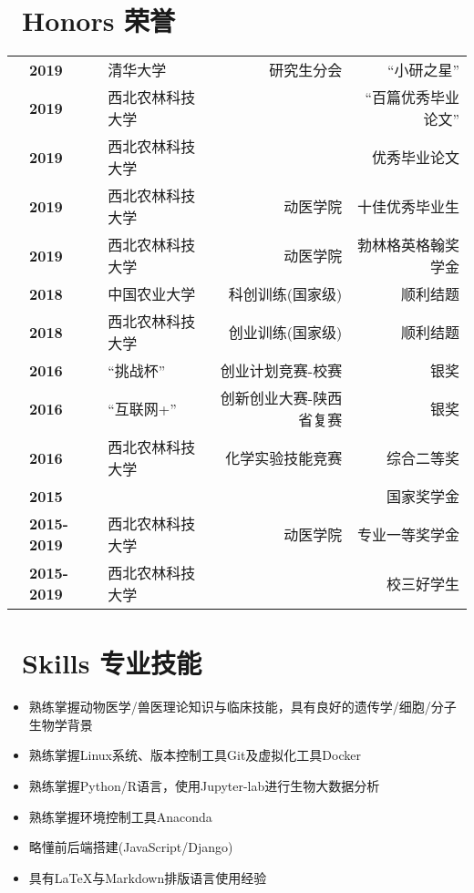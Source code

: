 \documentclass{resume}
\begin{document}
	
	
	\section{\faGraduationCap\ Honors 荣誉}
	
	\begin{tabularx}{\textwidth}{@{}l X l r r@{}}
	&	\textbf{2019} & {清华大学} & 研究生分会  &``小研之星'' \\
	&	\textbf{2019} & {西北农林科技大学} &   &``百篇优秀毕业论文'' \\
	&	\textbf{2019} & {西北农林科技大学} &   &优秀毕业论文 \\
	&	\textbf{2019} & {西北农林科技大学} &  动医学院 &十佳优秀毕业生 \\
	&	\textbf{2019} & {西北农林科技大学} &  动医学院 & 勃林格英格翰奖学金 \\
	&	\textbf{2018} & {中国农业大学} &  科创训练(国家级) & 顺利结题 \\
	&	\textbf{2018} & {西北农林科技大学} &  创业训练(国家级) & 顺利结题 \\
	&	\textbf{2016} & {``挑战杯''} & 创业计划竞赛-校赛 & 银奖 \\
	&	\textbf{2016} & {``互联网+''} &  创新创业大赛-陕西省复赛 & 银奖 \\
	&	\textbf{2016} & {西北农林科技大学} &  化学实验技能竞赛 & 综合二等奖 \\
	&	\textbf{2015} &  &   & 国家奖学金 \\
	&	\textbf{2015-2019} & 西北农林科技大学  & 动医学院  & 专业一等奖学金 \\
	&	\textbf{2015-2019} & 西北农林科技大学  &   & 校三好学生 \\
	\end{tabularx}
	
	
	\section{\faCogs\ Skills 专业技能}
	\begin{itemize}[parsep=0.5ex]
		\item 熟练掌握动物医学/兽医理论知识与临床技能，具有良好的遗传学/细胞/分子生物学背景
		\item 熟练掌握Linux系统、版本控制工具Git及虚拟化工具Docker
		\item 熟练掌握Python/R语言，使用Jupyter-lab进行生物大数据分析
		\item 熟练掌握环境控制工具Anaconda
		\item 略懂前后端搭建(JavaScript/Django)  
		\item 具有\LaTeX 与Markdown排版语言使用经验
	\end{itemize}
	
	
%	
\end{document}
